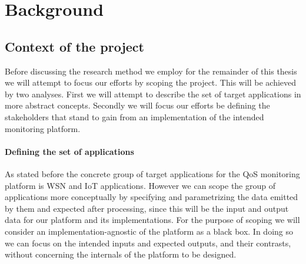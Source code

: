 \chapter{Background}
\label{ch:back}
\section{Context of the project}
\label{sec:back:context}
Before discussing the research method we employ for the remainder of this thesis we will attempt to focus our efforts by scoping the project. This will be achieved by two analyses. First we will attempt to describe the set of target applications in more abstract concepts. Secondly we will focus our efforts be defining the stakeholders that stand to gain from an implementation of the intended monitoring platform. 

\subsubsection*{Defining the set of applications}
As stated before the concrete group of target applications for the QoS monitoring platform is WSN and IoT applications. However we can scope the group of applications more conceptually by specifying and parametrizing the data emitted by them and expected after processing, since this will be the input and output data for our platform and its implementations. For the purpose of scoping we will consider an implementation-agnostic  of the platform as a black box. In doing so we can focus on the intended inputs and expected outputs, and their contrasts, without concerning the internals of the platform to be designed.

